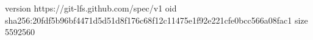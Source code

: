 version https://git-lfs.github.com/spec/v1
oid sha256:20fdf5b96bf4471d5d51d8f176c68f12c11475e1f92e221cfe0bcc566a08fac1
size 5592560
